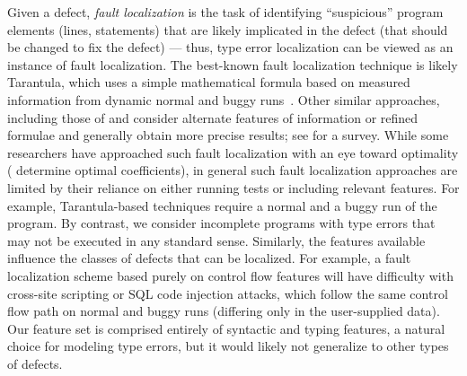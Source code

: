 Given a defect, \emph{fault localization} is the task of identifying
``suspicious'' program elements (\eg lines, statements) that are likely
implicated in the defect (\ie that should be changed to fix the defect)
%
--- thus, type error localization can be viewed as an instance of fault
localization.
%
The best-known fault localization technique is likely Tarantula, which
uses a simple mathematical formula based on measured information from
dynamic normal and buggy runs~\citep{Jones2002-us}.
%
Other similar approaches, including those of \citet{Chen2002-qz} and
\citet{Abreu2006-fn,Abreu2007-mu} consider alternate features of
information or refined formulae and generally obtain more precise
results; see \citet{Wong2009-pd} for a survey.
%
While some researchers have approached such fault localization with an
eye toward optimality (\eg \citet{Yoo2013-rw} determine optimal
coefficients), in general such fault localization approaches are limited
by their reliance on either running tests or including relevant
features.
%
For example, Tarantula-based techniques require a normal and a buggy run
of the program.
%
By contrast, we consider incomplete programs with type errors that may
not be executed in any standard sense.
%
Similarly, the features available influence the classes of defects that
can be localized.
%
For example, a fault localization scheme based purely on control flow features
will have difficulty with cross-site scripting or SQL code injection
attacks, which follow the same control flow path on normal and buggy
runs (differing only in the user-supplied data).
%
Our feature set is comprised entirely of syntactic and typing features,
a natural choice for modeling type errors, but it would likely not
generalize to other types of defects.





